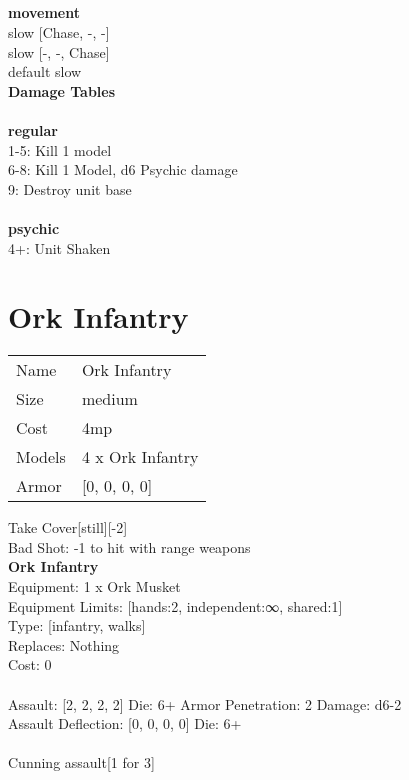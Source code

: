 \ \\

\ \\
 
\ \\



\ \\ {\bf movement } \\
slow [Chase, -, -] \\
slow [-, -, Chase] \\
default slow \\


{\bf Damage Tables} \\
\ \\ {\bf regular } \\
1-5: Kill 1 model \\
6-8: Kill 1 Model, d6 Psychic damage \\
9: Destroy unit base \\
\ \\ {\bf psychic } \\
4+: Unit Shaken \\










\pagebreak\pagebreak

\section{ Ork Infantry }

\begin{tabular}{ll}
  Name & Ork Infantry \\
  Size & medium\\
  Cost & 4mp\\
  Models & 4 x Ork Infantry\\
  Armor & [0, 0, 0, 0]\\
\end{tabular}

\noindent Take Cover[still][-2]\\ 
Bad Shot: -1 to hit with range weapons\\ 


{\bf Ork Infantry } \\
Equipment: 1 x Ork Musket \\
Equipment Limits: [hands:2, independent:∞, shared:1] \\
Type: [infantry, walks] \\
Replaces: Nothing \\
Cost: 0\\
\ \\
Assault: [2, 2, 2, 2] Die: 6+ Armor Penetration: 2 Damage: d6-2 \\
Assault Deflection: [0, 0, 0, 0] Die: 6+\\
\\ 
Cunning assault[1 for 3]\\ 
 
